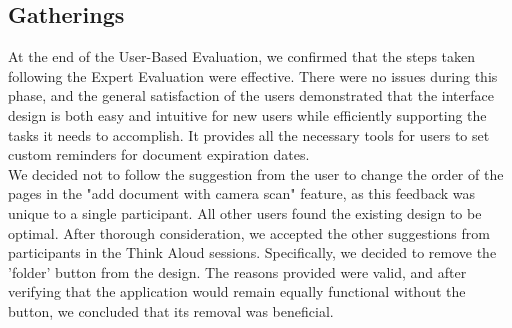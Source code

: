 \subsection{Gatherings}
At the end of the User-Based Evaluation, we confirmed that the steps taken following the Expert Evaluation were effective. There were no issues during this phase, and the general satisfaction of the users demonstrated that the interface design is both easy and intuitive for new users while efficiently supporting the tasks it needs to accomplish. It provides all the necessary tools for users to set custom reminders for document expiration dates.\\
We decided not to follow the suggestion from the user to change the order of the pages in the "add document with camera scan" feature, as this feedback was unique to a single participant. All other users found the existing design to be optimal.
After thorough consideration, we accepted the other suggestions from participants in the Think Aloud sessions. Specifically, we decided to remove the 'folder' button from the design. The reasons provided were valid, and after verifying that the application would remain equally functional without the button, we concluded that its removal was beneficial.

